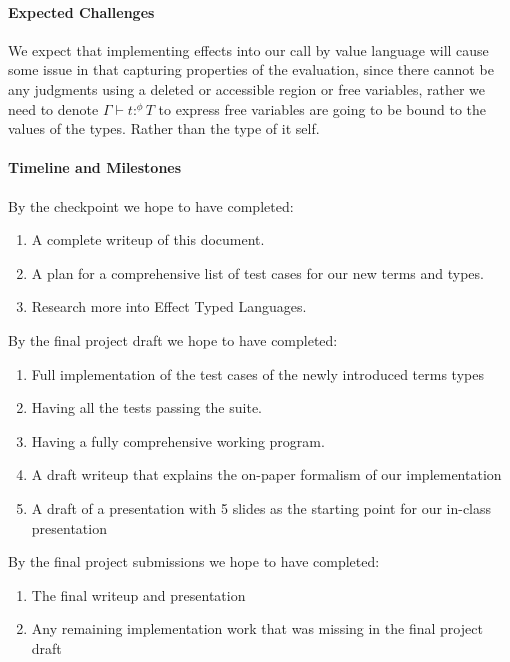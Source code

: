 \documentclass{article}
\begin{document}
\paragraph{Expected Challenges}

We expect that implementing effects into our call by value language will cause some issue in that capturing properties of the evaluation, since there cannot be any judgments using a deleted or accessible region or free variables, rather we need to denote $\Gamma \vdash t : ^\phi T$ to express free variables are going to be bound to the values of the types. Rather than the type of it self.

\paragraph{Timeline and Milestones}

By the checkpoint we hope to have completed:
\begin{enumerate}
\item A complete writeup of this document.
\item A plan for a comprehensive list of test cases for our new terms and types.
\item Research more into Effect Typed Languages.
\end{enumerate}

\noindent
By the final project draft we hope to have completed:
\begin{enumerate}
\item Full implementation of the test cases of the newly introduced terms types
\item Having all the tests passing the suite.
\item Having a fully comprehensive working program.
\item A draft writeup that explains the on-paper formalism of our
  implementation
\item A draft of a presentation with 5 slides as the starting point for our
  in-class presentation
\end{enumerate}

\noindent
By the final project submissions we hope to have completed:
\begin{enumerate}
\item The final writeup and presentation
\item Any remaining implementation work that was missing in the final project
  draft
\end{enumerate}
\end{document}
